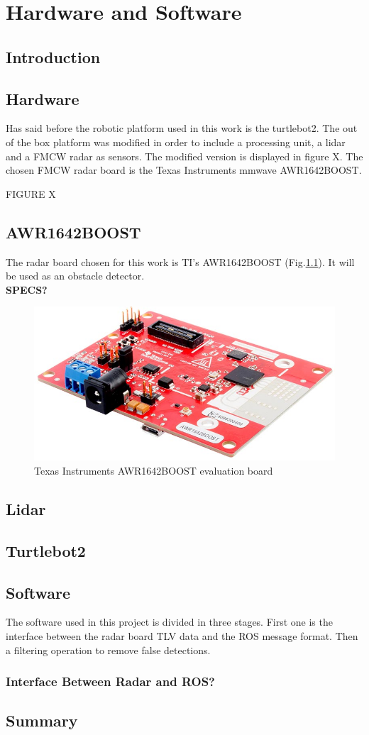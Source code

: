 \chapter{Hardware and Software}

\section{Introduction}

\section{Hardware}
Has said before the robotic platform used in this work is the turtlebot2. The out of the box platform was modified in order to include a processing unit, a lidar and a \ac{FMCW} radar as sensors. The modified version is displayed in figure X.  The chosen \ac{FMCW} radar board is the Texas Instruments mmwave AWR1642BOOST.

FIGURE X
\section{AWR1642BOOST}

The radar board chosen for this work is TI's AWR1642BOOST (Fig.\ref{fig:awr}). It will be used as an obstacle detector.\\
\textbf{SPECS?}
\begin{figure}[h] 
\centerline{\includegraphics [width=0.5 \textwidth]{imgs/chapter4/awr1642.jpg}}
\caption{Texas Instruments AWR1642BOOST evaluation board}
\label{fig:awr}
\end{figure}

\section{Lidar}

\section{Turtlebot2}
\section{Software}
The software used in this project is divided in three stages. First one is the interface between the radar board TLV data and the ROS message format. Then a filtering operation to remove false detections. 
\subsection{Interface Between Radar and ROS?}


\section{Summary}   

